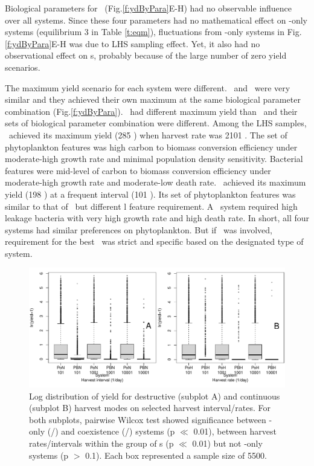 \documentclass[../thesis.tex]{subfiles} %
\begin{document}
Biological parameters for \bac\ (Fig.\ref{f:ydByPara}E-H) had no observable influence over all systems.  Since these four parameters had no mathematical effect on \phy-only systems (equilibrium 3 in Table \ref{t:eqm}), fluctuations from \phy-only systems in Fig.\ref{f:ydByPara}E-H was due to LHS sampling effect.  Yet, it also had no observational effect on \pbs s, probably because of the large number of zero yield scenarios.

The maximum yield scenario for each system were different.  \PoH\ and \PoN\ were very similar and they achieved their own maximum at the same biological parameter combination (Fig.\ref{f:ydByPara}).  \PBH\ had different maximum yield than \PBN\ and their sets of biological parameter combination were different.  Among the LHS samples, \PBH\ achieved its maximum yield (285 \dxdt) when harvest rate was 2101 \dayU.  The set of phytoplankton features was high carbon to biomass conversion efficiency under moderate-high growth rate and minimal population density sensitivity.  Bacterial features were mid-level of carbon to biomass conversion efficiency under moderate-high growth rate and moderate-low death rate.  \PBN\ achieved its maximum yield (198 \dxdt) at a frequent interval (101 \dayU).  Its set of phytoplankton features was similar to that of \PBH\ but different \bac l feature requirement.  A \PBN\ system required high leakage bacteria with very high growth rate and high death rate.  In short, all four systems had similar preferences on phytoplankton.  But if \bac\ was involved, requirement for the best \bac\ was strict and specific based on the designated type of system.

\begin{figure}[H]
    \centering
    \includegraphics[width=\linewidth]{result/Harvest.pdf}
    \caption[Yield flux distribution by harvest mode]{Log distribution of yield for destructive (subplot A) and continuous (subplot B) harvest modes on selected harvest interval/rates.  For both subplots, pairwise Wilcox test showed significance between \phy-only (\PoH/\PoN) and coexistence (\PBH/\PBN) systems (p $\ll$ 0.01), between harvest rates/intervals within the group of \pbs s (p $\ll$ 0.01) but not \phy-only systems (p $>$ 0.1).  Each box represented a sample size of 5500.}
    \label{f:ydByHarv}
\end{figure}
\end{document}
